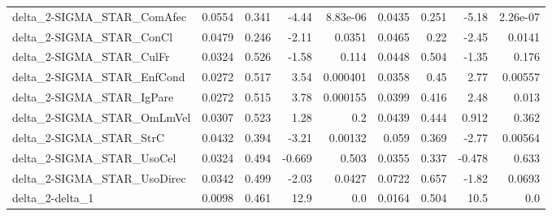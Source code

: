 \begin{tabular}{lrrrrrrrr}
delta\_2-SIGMA\_STAR\_ComAfec             &      0.0554 &        0.341 &    -4.44 & 8.83e-06 &     0.0435 &       0.251 &        -5.18 &      2.26e-07 \\
delta\_2-SIGMA\_STAR\_ConCl               &      0.0479 &        0.246 &    -2.11 &   0.0351 &     0.0465 &        0.22 &        -2.45 &        0.0141 \\
delta\_2-SIGMA\_STAR\_CulFr               &      0.0324 &        0.526 &    -1.58 &    0.114 &     0.0448 &       0.504 &        -1.35 &         0.176 \\
delta\_2-SIGMA\_STAR\_EnfCond             &      0.0272 &        0.517 &     3.54 & 0.000401 &     0.0358 &        0.45 &         2.77 &       0.00557 \\
delta\_2-SIGMA\_STAR\_IgPare              &      0.0272 &        0.515 &     3.78 & 0.000155 &     0.0399 &       0.416 &         2.48 &         0.013 \\
delta\_2-SIGMA\_STAR\_OmLmVel             &      0.0307 &        0.523 &     1.28 &      0.2 &     0.0439 &       0.444 &        0.912 &         0.362 \\
delta\_2-SIGMA\_STAR\_StrC                &      0.0432 &        0.394 &    -3.21 &  0.00132 &      0.059 &       0.369 &        -2.77 &       0.00564 \\
delta\_2-SIGMA\_STAR\_UsoCel              &      0.0324 &        0.494 &   -0.669 &    0.503 &     0.0355 &       0.337 &       -0.478 &         0.633 \\
delta\_2-SIGMA\_STAR\_UsoDirec            &      0.0342 &        0.499 &    -2.03 &   0.0427 &     0.0722 &       0.657 &        -1.82 &        0.0693 \\
delta\_2-delta\_1                        &      0.0098 &        0.461 &     12.9 &      0.0 &     0.0164 &       0.504 &         10.5 &           0.0 \\
\bottomrule
\end{tabular}
